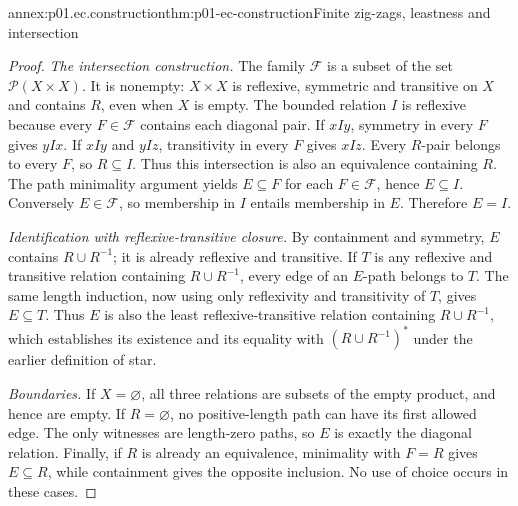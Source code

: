 \begin{annexitem}{annex:p01.ec.construction}{thm:p01-ec-construction}{Finite zig-zags, leastness and intersection}
\begin{proof}
\emph{The intersection construction.} The family \(\mathcal F\)
is a subset of the set \(\mathcal P(X\times X)\). It is nonempty:
\(X\times X\) is reflexive, symmetric and transitive on \(X\)
and contains \(R\), even when \(X\) is empty.
The bounded relation \(I\) is reflexive because every \(F\in\mathcal F\)
contains each diagonal pair. If \(xIy\), symmetry in every \(F\)
gives \(yIx\). If \(xIy\) and \(yIz\), transitivity in every
\(F\) gives \(xIz\). Every \(R\)-pair belongs to every \(F\),
so \(R\subseteq I\). Thus this intersection is also an equivalence
containing \(R\). The path minimality argument yields
\(E\subseteq F\) for each \(F\in\mathcal F\), hence
\(E\subseteq I\). Conversely \(E\in\mathcal F\), so membership
in \(I\) entails membership in \(E\). Therefore \(E=I\).

\emph{Identification with reflexive-transitive closure.} By containment
and symmetry, \(E\) contains \(R\cup R^{-1}\); it is already
reflexive and transitive. If \(T\) is any reflexive and transitive
relation containing \(R\cup R^{-1}\), every edge of an \(E\)-path
belongs to \(T\). The same length induction, now using only
reflexivity and transitivity of \(T\), gives \(E\subseteq T\).
Thus \(E\) is also the least reflexive-transitive relation containing
\(R\cup R^{-1}\), which establishes its existence and its equality
with \((R\cup R^{-1})^*\) under the earlier definition of star.

\emph{Boundaries.} If \(X=\varnothing\), all three relations are
subsets of the empty product, and hence are empty. If \(R=\varnothing\),
no positive-length path can have its first allowed edge. The only
witnesses are length-zero paths, so \(E\) is exactly the diagonal
relation. Finally, if \(R\) is already an equivalence, minimality
with \(F=R\) gives \(E\subseteq R\), while containment gives
the opposite inclusion. No use of choice occurs in these cases.
\end{proof}
\end{annexitem}

